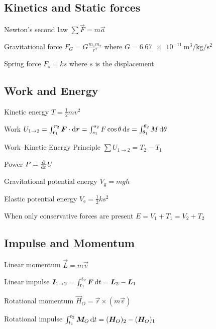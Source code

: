 \documentclass{article}
\begin{document}
\subsection{Kinetics and Static forces}
\label{sec:particle-kinetics}

\begin{description*}
\item[Newton's second law]
  \(\sum\vec{F} = m\vec{a}\)
\item[Gravitational force]
  \(F_G = G\frac{m_1m_2}{r^2}\) where
  \(G = \SI{6.67e-11}{\cubic\meter\per\kilogram\per\square\second}\)
\item[Spring force]
  \(F_s = ks\) where $s$ is the displacement
\end{description*}

\subsection{Work and Energy}
\label{sec:particle-energy}

\begin{description*}
\item[Kinetic energy]
  \(T = \frac12mv^2\)
\item[Work]
  \(U_{1\rightarrow2} = \int_{\vec{r}_1}^{\vec{r}_2}\vec{F}\cdot\dif\vec{r}
  = \int_{s_1}^{s_2}F\cos\theta\dif{s} = \int_{\theta_1}^{\theta_2}M\dif{\theta}\)
\item[Work--Kinetic Energy Principle]
  \(\sum U_{1\rightarrow2} = T_2 - T_1\)
\item[Power]
  \(P = \od{}{t}U\)
\item[Gravitational potential energy]
  \(V_\mathrm{g} = mgh\)
\item[Elastic potential energy]
  \(V_\mathrm{e} = \frac12ks^2\)
\item[When only conservative forces are present]
  \(E = V_1 + T_1 = V_2 + T_2\)

\end{description*}

\subsection{Impulse and Momentum}
\label{sec:particle-momentum}

\begin{description*}
\item[Linear momentum]
  \(\vec{L} = m\vec{v}\)
\item[Linear impulse]
  \(\vec{I}_{1\rightarrow2} = \int_{t_1}^{t_2}\vec{F}\dif{t} = \vec{L}_2 - \vec{L}_1\)
\item[Rotational momentum]
  \(\vec{H}_O = \vec{r} \times (m\vec{v})\)
\item[Rotational impulse]
  \(\int_{t_1}^{t_2}\vec{M}_O\dif{t} = (\vec{H}_O)_2 - (\vec{H}_O)_1\)
\end{description*}
\end{document}
